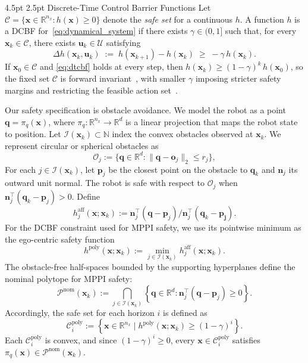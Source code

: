 \documentclass[letterpaper, 10 pt, conference]{ieeeconf}
\makeatletter
\newcommand{\piq}{\pi_q}
\newcommand{\n}{\mathbf{n}}
\newcommand{\p}{\mathbf{p}}
\newcommand{\q}{\mathbf{q}}
\newcommand{\qk}{\mathbf{\q}_{k}}
\newcommand{\x}{\mathbf{x}}
\renewcommand{\u}{\mathbf{u}}
\newcommand{\xk}{\mathbf{x}_{k}}
\newcommand{\oj}{\mathbf{o}_{j}}
\renewcommand{\subsection}{%
  \@startsection{subsection}{2}{\z@}%
  {4.5pt}%
  {2.5pt}%
  {\normalfont\normalsize\itshape}}
\makeatother
\begin{document}
\subsection{Discrete-Time Control Barrier Functions}
Let \(\mathcal{C}=\{\x\!\in\!\mathbb{R}^{n_x}\!:\!h(\x)\!\ge\!0\}\) denote the \emph{safe set} for a continuous $h$.
A function $h$ is a DCBF
for~\eqref{eq:dynamical_system} if there exists $\gamma\in(0,1]$
such that, for every $\x_k\in\mathcal C$, there exists
$\u_k\in\mathcal U$ satisfying
\begin{equation}
    \Delta h(\x_k,\u_k)\;:=\;h(\x_{k+1})-h(\x_k)\;\ge\;-\gamma\,h(\x_k).
    \label{eq:dtcbf}
\end{equation}
If $\x_0\in\mathcal C$ and \eqref{eq:dtcbf} holds
at every step, then \(h(\x_k)\!\ge\!(1-\gamma)^{k}\,h(\x_0)\), so the fixed set $\mathcal{C}$ is forward invariant~\cite{ames2014cbf,agrawal2017discrete}, with smaller $\gamma$ imposing stricter safety margins and restricting the feasible action set~\cite{zeng2021enhancing}.

Our safety specification is obstacle avoidance. We model the robot as a point $\q\!=\!\piq(\x)$,
where $\piq:\!\mathbb R^{n_x}\!\to\!\mathbb R^d$ is a linear projection that maps the robot state to position. 
Let $\mathcal I(\xk)\subset\mathbb N$ index the convex obstacles observed at $\xk$. We represent circular or spherical obstacles as 
\begin{equation}
\mathcal O_j:=\{\q\in\mathbb R^d\!:\!\|\q-\oj\|_2\!\le\! r_j\},
\label{eq:obstacle}
\end{equation}
For each $j\in\mathcal I(\xk)$, let $\p_j$ be the closest point on the obstacle to $\qk$ and $\n_j$ its outward unit normal. The robot is safe with respect to $\mathcal O_j$ when \(\n_j^\top(\qk-\p_j)>0\).
Define
\begin{equation}
h_j^{\mathrm{aff}}(\x;\xk) :=\n_j^\top(\q-\p_j)/\n_j^\top(\q_{k}-\mathbf{p_j}).
\label{eq:aff_barrier}
\end{equation}
For the DCBF constraint used for MPPI safety, we use its pointwise minimum as the ego-centric safety function
\begin{equation}\label{eq:poly_single}
h^{\mathrm{poly}}(\x;\xk):=\min_{j\in\mathcal I(\xk)} h_j^{\mathrm{aff}}(\x;\xk).
\end{equation}
The obstacle-free half-spaces bounded by the supporting hyperplanes define the nominal polytope for MPPI safety:
\begin{equation}
\mathcal P^{\mathrm{nom}}(\xk)
:=\bigcap_{j\in\mathcal I(\xk)}
\left\{
\q\in\mathbb R^d:
\n_j^\top(\q-\p_j)\ge0
\right\}.
\label{eq:nominalpolytope}
\end{equation}
Accordingly, the safe set for each horizon $i$ is defined as
\begin{equation}
\mathcal C_i^{\mathrm{poly}}
:=
\left\{
\x\in\mathbb R^{n_x}
\mid
h^{\mathrm{poly}}(\x;\xk)\ge(1-\gamma)^i
\right\}.
\label{eq:poly_safeset}
\end{equation}
Each $\mathcal C_i^{\mathrm{poly}}$ is convex, and since
$(1-\gamma)^i\ge0$, every $\x\in\mathcal C_i^{\mathrm{poly}}$
satisfies $\piq(\x)\in\mathcal P^{\mathrm{nom}}(\xk)$.
\end{document}
